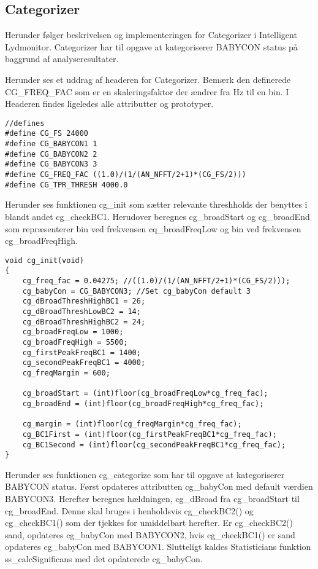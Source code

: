 \subsection{Categorizer}
Herunder følger beskrivelsen og implementeringen for Categorizer i Intelligent Lydmonitor.
Categorizer har til opgave at kategoriserer BABYCON status på baggrund af analyseresultater. 


Herunder ses et uddrag af headeren for Categorizer. Bemærk den definerede CG\_FREQ\_FAC som er en skaleringsfaktor der ændrer fra Hz til en bin. I Headeren findes ligeledes alle attributter og prototyper.

\begin{verbatim}//defines
#define CG_FS 24000
#define CG_BABYCON1 1
#define CG_BABYCON2 2
#define CG_BABYCON3 3
#define CG_FREQ_FAC ((1.0)/(1/(AN_NFFT/2+1)*(CG_FS/2)))
#define CG_TPR_THRESH 4000.0
\end{verbatim}

Herunder ses funktionen cg\_init som sætter relevante threshholds der benyttes i blandt andet cg\_checkBC1. Herudover beregnes cg\_broadStart og cg\_broadEnd som repræsenterer bin ved frekvensen cq\_broadFreqLow og bin ved frekvensen cg\_broadFreqHigh. 

\begin{verbatim}void cg_init(void)
{
    cg_freq_fac = 0.04275; //((1.0)/(1/(AN_NFFT/2+1)*(CG_FS/2)));
    cg_babyCon = CG_BABYCON3; //Set cg_babyCon default 3
    cg_dBroadThreshHighBC1 = 26;
    cg_dBroadThreshLowBC2 = 14;
    cg_dBroadThreshHighBC2 = 24;
    cg_broadFreqLow = 1000;
    cg_broadFreqHigh = 5500;
    cg_firstPeakFreqBC1 = 1400;
    cg_secondPeakFreqBC1 = 4000;
    cg_freqMargin = 600;

    cg_broadStart = (int)floor(cg_broadFreqLow*cg_freq_fac);
    cg_broadEnd = (int)floor(cg_broadFreqHigh*cg_freq_fac);

    cg_margin = (int)floor(cg_freqMargin*cg_freq_fac);
    cg_BC1First = (int)floor(cg_firstPeakFreqBC1*cg_freq_fac);
    cg_BC1Second = (int)floor(cg_secondPeakFreqBC1*cg_freq_fac);
}
\end{verbatim}

Herunder ses funktionen cg\_categorize som har til opgave at kategoriserer BABYCON status. 
Først opdateres attributten cg\_babyCon med default værdien BABYCON3. 
Herefter beregnes hældningen, cg\_dBroad fra cg\_broadStart til cg\_broadEnd. Denne skal bruges i henholdsvis cg\_checkBC2() og cg\_checkBC1() som der tjekkes for umiddelbart herefter. Er cg\_checkBC2() sand, opdateres cg\_babyCon med BABYCON2, hvis cg\_checkBC1() er sand opdateres cg\_babyCon med BABYCON1.
Slutteligt kaldes Statisticians funktion ss\_calcSignificans med det opdaterede cg\_babyCon.


